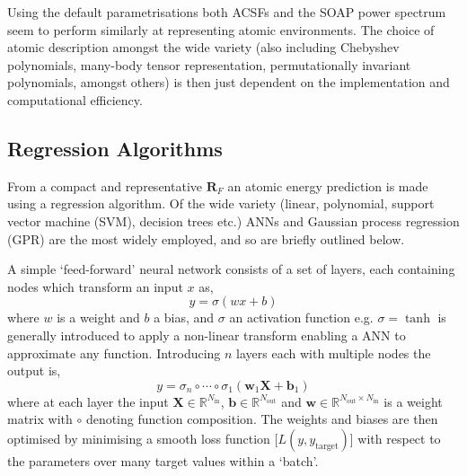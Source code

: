 \documentclass[main.tex]{subfiles}
\begin{document}
 Using the default parametrisations both ACSFs and the SOAP power spectrum seem to perform similarly at representing atomic environments.\cite{Pozdnyakov2020, Onat2020} The choice of atomic description amongst the wide variety (also including Chebyshev polynomials\cite{Thompson2015}, many-body tensor representation\cite{Huo2018unified}, permutationally invariant polynomials\cite{Braams2009, Oord2020}, amongst others) is then just dependent on the implementation and computational efficiency.


\subsection{Regression Algorithms}

From a compact and representative $\boldsymbol{R}_F$ an atomic energy prediction is made using a regression algorithm. Of the wide variety (linear, polynomial, support vector machine (SVM), decision trees etc.\cite{HandsOnML2019}) ANNs and Gaussian process regression (GPR) are the most widely employed,\cite{Mueller2020} and so are briefly outlined below.

A simple `feed-forward' neural network consists of a set of layers, each containing nodes which transform an input $x$ as,
\begin{equation}
	y = \sigma(w x + b)
\end{equation}
where $w$ is a weight and $b$ a bias, and $\sigma$ an activation function e.g. $\sigma = \tanh$ is generally introduced to apply a non-linear transform enabling a ANN to approximate any function.\cite{Nielsen2015neural} Introducing $n$ layers each with multiple nodes the output is,
\begin{equation}
	y = \sigma_n \circ \cdots \circ \sigma_1(\boldsymbol{w}_1 \boldsymbol{X} + \boldsymbol{b}_1)
\end{equation}
where at each layer the input $\boldsymbol{X} \in \mathbb{R}^{N_\text{in}}$, $\boldsymbol{b} \in \mathbb{R}^{N_\text{out}}$ and $\boldsymbol{w} \in \mathbb{R}^{N_\text{out} \times N_\text{in}}$ is a weight matrix with $\circ$ denoting function composition. The weights and biases are then optimised by minimising a smooth loss function [$L(y, y_\text{target})$] with respect to the parameters over many target values within a `batch'. 
\end{document}
